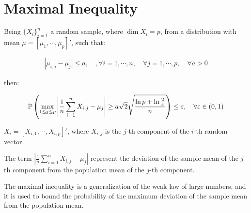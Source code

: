 \section{Maximal Inequality}

Being $\{X_i\}_{i=1}^n$ a random sample, where $\dim{X_i} = p$, from a distribution with mean $\mu = [\mu_1, \cdots, \mu_p]'$, such that:

\begin{align*}
|\mu_{i,j} - \mu_{j}| \leq a, \quad, \forall i = 1, \cdots, n, \quad \forall j = 1, \cdots, p, \quad \forall a > 0
\end{align*}

then: 

\begin{align*}
\mathbb{P}\left(
    \max_{1 \leq j \leq p}{
        \left|
            \frac{1}{n} \sum_{i=1}^{n} X_{i,j} - \mu_{j}
        \right|
    }
    \geq
    a \sqrt{2} \sqrt{
        \dfrac{\ln p + \ln \frac{2}{\varepsilon}}{n}
    }
\right) \leq \varepsilon, \quad \forall \varepsilon \in (0, 1)
\end{align*}

$X_i = [X_{i,1}, \cdots, X_{i,p}]'$, where $X_{i,j}$ is the $j$-th component of the $i$-th random vector.

The term 
$
\left|
        \frac{1}{n} \sum_{i=1}^{n} X_{i,j} - \mu_{j}
\right|
$
represent the deviation of the sample mean of the $j$-th component from the population mean of the $j$-th component.

The maximal inequality is a generalization of the weak law of large numbers, and it is used to bound the probability of the maximum deviation of the sample mean from the population mean.


